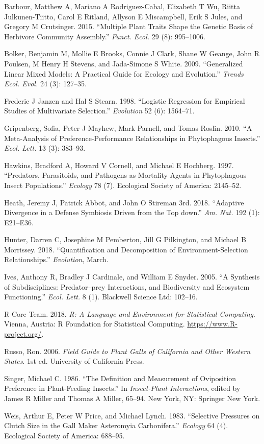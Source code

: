 \documentclass[]{elsarticle} %
\begin{document}
\hypertarget{ref-Barbour2015}{}
Barbour, Matthew A, Mariano A Rodriguez-Cabal, Elizabeth T Wu, Riitta
Julkunen-Tiitto, Carol E Ritland, Allyson E Miscampbell, Erik S Jules,
and Gregory M Crutsinger. 2015. ``Multiple Plant Traits Shape the
Genetic Basis of Herbivore Community Assembly.'' \emph{Funct. Ecol.} 29
(8): 995--1006.

\hypertarget{ref-Bolker2009}{}
Bolker, Benjamin M, Mollie E Brooks, Connie J Clark, Shane W Geange,
John R Poulsen, M Henry H Stevens, and Jada-Simone S White. 2009.
``Generalized Linear Mixed Models: A Practical Guide for Ecology and
Evolution.'' \emph{Trends Ecol. Evol.} 24 (3): 127--35.

\hypertarget{ref-Janzen1998}{}
Frederic J Janzen and Hal S Stearn. 1998. ``Logistic Regression for
Empirical Studies of Multivariate Selection.'' \emph{Evolution} 52 (6):
1564--71.

\hypertarget{ref-Gripenberg2010}{}
Gripenberg, Sofia, Peter J Mayhew, Mark Parnell, and Tomas Roslin. 2010.
``A Meta-Analysis of Preference-Performance Relationships in
Phytophagous Insects.'' \emph{Ecol. Lett.} 13 (3): 383--93.

\hypertarget{ref-Hawkins1997}{}
Hawkins, Bradford A, Howard V Cornell, and Michael E Hochberg. 1997.
``Predators, Parasitoids, and Pathogens as Mortality Agents in
Phytophagous Insect Populations.'' \emph{Ecology} 78 (7). Ecological
Society of America: 2145--52.

\hypertarget{ref-Heath2018}{}
Heath, Jeremy J, Patrick Abbot, and John O Stireman 3rd. 2018.
``Adaptive Divergence in a Defense Symbiosis Driven from the Top down.''
\emph{Am. Nat.} 192 (1): E21--E36.

\hypertarget{ref-Hunter2018}{}
Hunter, Darren C, Josephine M Pemberton, Jill G Pilkington, and Michael
B Morrissey. 2018. ``Quantification and Decomposition of
Environment-Selection Relationships.'' \emph{Evolution}, March.

\hypertarget{ref-Ives2005}{}
Ives, Anthony R, Bradley J Cardinale, and William E Snyder. 2005. ``A
Synthesis of Subdisciplines: Predator--prey Interactions, and
Biodiversity and Ecosystem Functioning.'' \emph{Ecol. Lett.} 8 (1).
Blackwell Science Ltd: 102--16.

\hypertarget{ref-R2018}{}
R Core Team. 2018. \emph{R: A Language and Environment for Statistical
Computing}. Vienna, Austria: R Foundation for Statistical Computing.
\url{https://www.R-project.org/}.

\hypertarget{ref-Russo2006}{}
Russo, Ron. 2006. \emph{Field Guide to Plant Galls of California and
Other Western States}. 1st ed. University of California Press.

\hypertarget{ref-Singer1986}{}
Singer, Michael C. 1986. ``The Definition and Measurement of Oviposition
Preference in Plant-Feeding Insects.'' In \emph{Insect-Plant
Interactions}, edited by James R Miller and Thomas A Miller, 65--94. New
York, NY: Springer New York.

\hypertarget{ref-Weis1983}{}
Weis, Arthur E, Peter W Price, and Michael Lynch. 1983. ``Selective
Pressures on Clutch Size in the Gall Maker Asteromyia Carbonifera.''
\emph{Ecology} 64 (4). Ecological Society of America: 688--95.
\end{document}
